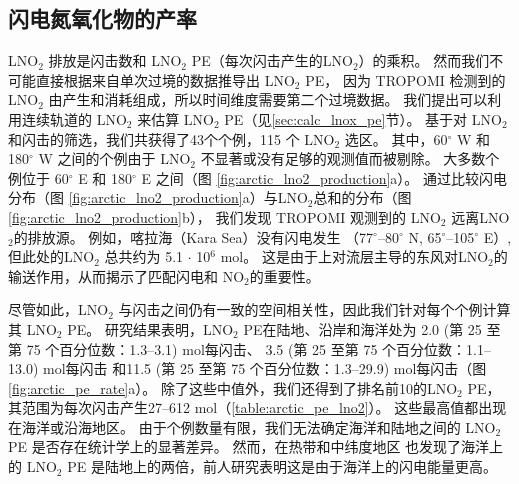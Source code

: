 \subsection{闪电氮氧化物的产率}

LNO$_2$ 排放是闪击数和 LNO$_2$ PE（每次闪击产生的LNO$_2$）的乘积。
然而我们不可能直接根据来自单次过境的数据推导出 LNO$_2$ PE，
因为 TROPOMI 检测到的 LNO$_2$ 由产生和消耗组成，所以时间维度需要第二个过境数据。
我们提出可以利用连续轨道的 LNO$_2$ 来估算 LNO$_2$ PE（见\ref{sec:calc_lnox_pe}节）。
基于对 LNO$_2$ 和闪击的筛选，我们共获得了43个个例，115 个 LNO$_2$ 选区。
其中，60$^{\circ}$ W 和 180$^{\circ}$ W 之间的个例由于 LNO$_2$ 不显著或没有足够的观测值而被剔除。
大多数个例位于 60$^{\circ}$ E 和 180$^{\circ}$ E 之间（图 \ref{fig:arctic_lno2_production}a）。
通过比较闪电分布（图 \ref{fig:arctic_lno2_production}a）与LNO$_2$总和的分布（图 \ref{fig:arctic_lno2_production}b），
我们发现 TROPOMI 观测到的 LNO$_2$ 远离LNO$_2$的排放源。
例如，喀拉海（Kara Sea）没有闪电发生 （77$^{\circ}$--80$^{\circ}$ N, 65$^{\circ}$--105$^{\circ}$ E）,
但此处的LNO$_2$ 总共约为 5.1 $\cdot$ 10$^6$ mol。
这是由于上对流层主导的东风对LNO$_2$的输送作用，从而揭示了匹配闪电和 NO$_2$的重要性。

尽管如此，LNO$_2$ 与闪击之间仍有一致的空间相关性，因此我们针对每个个例计算其 LNO$_2$ PE。
研究结果表明，LNO$_2$ PE在陆地、沿岸和海洋处为 2.0 (第 25 至第 75 个百分位数：1.3--3.1) mol每闪击、
3.5 (第 25 至第 75 个百分位数：1.1--13.0) mol每闪击
和11.5 (第 25 至第 75 个百分位数：1.3--29.9) mol每闪击（图 \ref{fig:arctic_pe_rate}a）。
除了这些中值外，我们还得到了排名前10的LNO$_2$ PE，其范围为每次闪击产生27--612 mol（\ref{table:arctic_pe_lno2}）。
这些最高值都出现在海洋或沿海地区。
由于个例数量有限，我们无法确定海洋和陆地之间的 LNO$_2$ PE 是否存在统计学上的显著差异。
然而，在热带和中纬度地区 \citet{Marais.2018,Allen.2019,Bucsela.2019} 也发现了海洋上的 LNO$_2$ PE 是陆地上的两倍，前人研究表明这是由于海洋上的闪电能量更高\citep{Beirle.2014,Hutchins.2013}。

